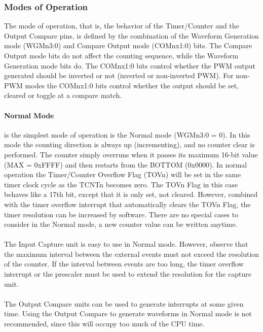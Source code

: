 \documentclass[english]{article}
\begin{document}
\subsubsection{Modes of Operation}
The mode of operation, that is, the behavior of the Timer/Counter and the Output Compare pins,
is defined by the combination of the Waveform Generation mode (WGMn3:0) and Compare Output mode (COMnx1:0) bits. The Compare Output mode bits do not affect the counting sequence, while the Waveform Generation mode bits do. The COMnx1:0 bits control whether the PWM output generated should be inverted or not (inverted or non-inverted PWM). For non-PWM modes the COMnx1:0 bits control whether the output should be set, cleared or toggle at a compare match. 
\paragraph{Normal Mode} is the simplest mode of operation is the Normal mode (WGMn3:0 = 0). In this mode the counting direction is always up (incrementing), and no counter clear is performed. The counter simply overruns when it passes its maximum 16-bit value (MAX = 0xFFFF) and then restarts from the BOTTOM (0x0000). In normal operation the Timer/Counter Overflow Flag (TOVn) will be set in
the same timer clock cycle as the TCNTn becomes zero. The TOVn Flag in this case behaves like a 17th bit, except that it is only set, not cleared. However, combined with the timer overflow interrupt that automatically clears the TOVn Flag, the timer resolution can be increased by software. There are no special cases to consider in the Normal mode, a new counter value can be written anytime.\\\\
The Input Capture unit is easy to use in Normal mode. However, observe that the maximum interval between the external events must not exceed the resolution of the counter. If the interval between events are too long, the timer overflow interrupt or the prescaler must be used to extend the resolution for the capture unit.\\\\
The Output Compare units can be used to generate interrupts at some given time. Using the Output Compare to generate waveforms in Normal mode is not recommended, since this will occupy too much of the CPU time.
\end{document}
